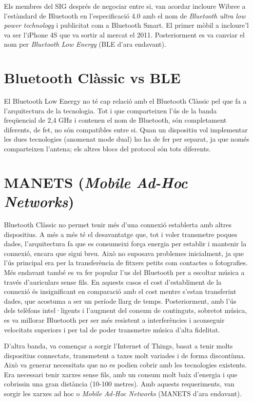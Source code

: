 Els membres del SIG després de negociar entre si, van acordar incloure Wibree a l'estàndard de Bluetooth en l'especificació 4.0 amb el nom de \textit{Bluetooth ultra low power technology} i publicitat com a Bluetooth Smart. El primer mòbil a incloure'l va ser l'iPhone 4S que va sortir al mercat el 2011.
Posteriorment es va canviar el nom per \textit{Bluetooth Low Energy} (BLE d'ara endavant).

\section{Bluetooth Clàssic vs BLE}
El Bluetooth Low Energy no té cap relació amb el Bluetooth Clàssic pel que fa a l'arquitectura de la tecnologia.
Tot i que comparteixen l'ús de la banda freqüencial de 2,4 GHz i contenen el nom de Bluetooth, són completament diferents, de fet, no són compatibles entre si.
Quan un dispositiu vol implementar les dues tecnologies (anomenat mode dual) ho ha de fer per separat, ja que només comparteixen l'antena; els altres blocs del protocol són tots diferents.
\newpage

\section{MANETS (\textit{Mobile Ad-Hoc Networks})}
Bluetooth Clàssic no permet tenir més d'una connexió establerta amb altres dispositius.
A més a més té el desavantatge que, tot i voler transmetre poques dades, l'arquitectura fa que es consumeixi força energia per establir i mantenir la connexió, encara que sigui breu.
Això no suposava problemes inicialment, ja que l'ús principal era per la transferència de fitxers petits com contactes o fotografies.
Més endavant també es va fer popular l'us del Bluetooth per a escoltar música a través d'auriculars sense fils.
En aquests casos el cost d'establiment de la connexió és insignificant en comparació amb el cost mentre s'estan transferint dades, que acostuma a ser un període llarg de temps.
Posteriorment, amb l'ús dels telèfons intel·ligents i l'augment del consum de continguts, sobretot música, es va millorar Bluetooth per ser més resistent a interferències i aconseguir velocitats superiors i per tal de poder transmetre música d'alta fidelitat.

D'altra banda, va començar a sorgir l'Internet of Things, basat a tenir molts dispositius connectats, transmetent a taxes molt variades i de forma discontínua.
Això va generar necessitats que no es podien cobrir amb les tecnologies existents.
Era necessari tenir xarxes sense fils, amb un consum molt baix d'energia i que cobrissin una gran distància (10-100 metres).
Amb aquests requeriments, van sorgir les xarxes ad hoc o \textit{Mobile Ad-Hoc Networks} (MANETS d'ara endavant).

